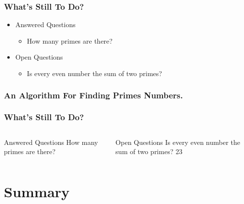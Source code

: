\documentclass{beamer}
\begin{document}
\begin{frame}
	\frametitle{What's Still To Do?}
	\begin{itemize}
		\item Answered Questions
		      \begin{itemize}
			      \item How many primes are there?~\cite{Author1990}
		      \end{itemize}
		\item Open Questions
		      \begin{itemize}
			      \item Is every even number the sum of two primes?
		      \end{itemize}
	\end{itemize}
\end{frame}

\begin{frame}[fragile]
	\frametitle{An Algorithm For Finding Primes Numbers.}
	\begin{semiverbatim}
	\end{semiverbatim}
\end{frame}

\begin{frame}
	\frametitle{What's Still To Do?}
	\begin{columns}[t]
		\begin{block}{Answered Questions}
			How many primes are there?
		\end{block}\pause
		\begin{block}{Open Questions}
			Is every even number the sum of two primes?
			23
		\end{block}
	\end{columns}
\end{frame}


\section*{Summary}
\end{document}
